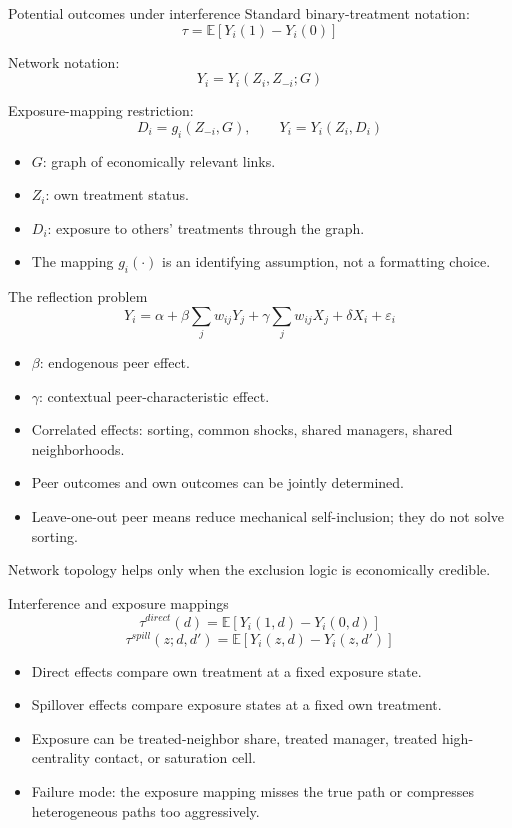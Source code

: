\documentclass[aspectratio=169,11pt]{beamer}
\newcommand{\E}{\mathbb{E}}
\newcommand{\1}{\mathbf{1}}
\begin{document}
\begin{frame}{Potential outcomes under interference}
\small
Standard binary-treatment notation:
\[
\tau=\E[Y_i(1)-Y_i(0)]
\]

Network notation:
\[
Y_i = Y_i(Z_i,Z_{-i};G)
\]

Exposure-mapping restriction:
\[
D_i=g_i(Z_{-i},G), \qquad Y_i=Y_i(Z_i,D_i)
\]

\begin{itemize}
    \item \(G\): graph of economically relevant links.
    \item \(Z_i\): own treatment status.
    \item \(D_i\): exposure to others' treatments through the graph.
    \item The mapping \(g_i(\cdot)\) is an identifying assumption, not a formatting choice.
\end{itemize}
\end{frame}

\begin{frame}{The reflection problem}
\small
\[
Y_i
=
\alpha
+ \beta \sum_j w_{ij}Y_j
+ \gamma \sum_j w_{ij}X_j
+ \delta X_i
+ \varepsilon_i
\]

\begin{itemize}
    \item \(\beta\): endogenous peer effect.
    \item \(\gamma\): contextual peer-characteristic effect.
    \item Correlated effects: sorting, common shocks, shared managers, shared neighborhoods.
    \item Peer outcomes and own outcomes can be jointly determined.
    \item Leave-one-out peer means reduce mechanical self-inclusion; they do not solve sorting.
\end{itemize}

\medskip
Network topology helps only when the exclusion logic is economically credible.
\end{frame}

\begin{frame}{Interference and exposure mappings}
\small
\[
\tau^{direct}(d)=\E[Y_i(1,d)-Y_i(0,d)]
\]
\[
\tau^{spill}(z;d,d')=\E[Y_i(z,d)-Y_i(z,d')]
\]

\begin{itemize}
    \item Direct effects compare own treatment at a fixed exposure state.
    \item Spillover effects compare exposure states at a fixed own treatment.
    \item Exposure can be treated-neighbor share, treated manager, treated high-centrality contact, or saturation cell.
    \item Failure mode: the exposure mapping misses the true path or compresses heterogeneous paths too aggressively.
\end{itemize}
\end{frame}
\end{document}
